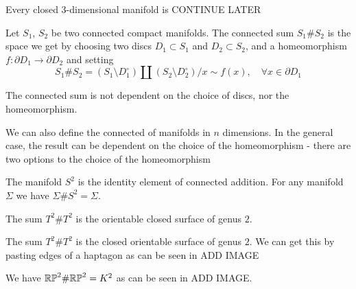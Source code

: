 \documentclass[11pt,a4paper]{article}
\begin{document}
%
%
%

\begin{remark}
  Every closed $3$-dimensional manifold is CONTINUE LATER
\end{remark}

\begin{definition}
  Let $S_1$, $S_2$ be two connected compact manifolds.
  The connected sum $S_1 \# S_2$ is the space we get by
  choosing two discs $D_1 \subset S_1$ and $D_2 \subset S_2$,
  and a homeomorphism $f \colon \partial D_1 \to \partial D_2$ and setting
  \[
    S_1 \# S_2 = 
    (S_1 \setminus D_1^{\circ}) \amalg
    (S_2 \setminus D_2^{\circ}) \slash x \sim f(x),
    \quad \forall x \in \partial D_1
  \]
\end{definition}
\begin{remark}
  The connected sum is not dependent on the choice of discs,
  nor the homeomorphism.
\end{remark}
\begin{remark}
  We can also define the connected of manifolds in $n$ dimensions.
  In the general case, the result can be dependent on the choice of the
  homeomorphism - there are two options to the choice of the homeomorphism
\end{remark}

\begin{example}
  The manifold $S^2$ is the identity element of connected addition.
  For any manifold $\Sigma$ we have $\Sigma \# S^2 = \Sigma$.
\end{example}
\begin{example}
  The sum $T^2 \# T^2$ is the orientable closed surface of genus $2$.
\end{example}
\begin{example}
  The sum $T^2 \# T^2$ is the closed orientable surface of genus $2$.
  We can get this by pasting edges of a haptagon as can be seen in ADD IMAGE
\end{example}
\begin{example}
  We have $\mathbb{RP}^2 \# \mathbb{RP}^2 = K^2$ as can be seen in ADD IMAGE.
\end{example}
\end{document}
